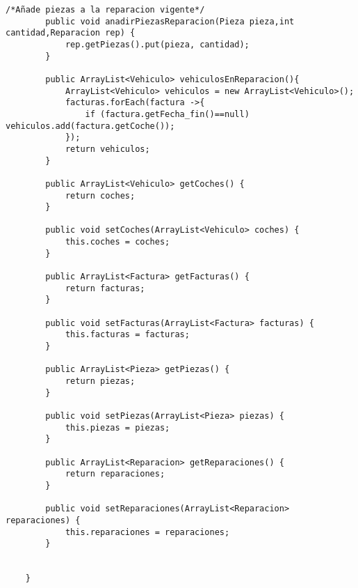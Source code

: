 \begin{lstlisting}[caption=GestorOperaciones.java (App Escritorio)]
        /*Añade piezas a la reparacion vigente*/
        public void anadirPiezasReparacion(Pieza pieza,int cantidad,Reparacion rep) {
            rep.getPiezas().put(pieza, cantidad);
        }
        
        public ArrayList<Vehiculo> vehiculosEnReparacion(){
            ArrayList<Vehiculo> vehiculos = new ArrayList<Vehiculo>();
            facturas.forEach(factura ->{
                if (factura.getFecha_fin()==null) vehiculos.add(factura.getCoche());
            });
            return vehiculos;
        }
    
        public ArrayList<Vehiculo> getCoches() {
            return coches;
        }
    
        public void setCoches(ArrayList<Vehiculo> coches) {
            this.coches = coches;
        }
    
        public ArrayList<Factura> getFacturas() {
            return facturas;
        }
    
        public void setFacturas(ArrayList<Factura> facturas) {
            this.facturas = facturas;
        }
    
        public ArrayList<Pieza> getPiezas() {
            return piezas;
        }
    
        public void setPiezas(ArrayList<Pieza> piezas) {
            this.piezas = piezas;
        }
    
        public ArrayList<Reparacion> getReparaciones() {
            return reparaciones;
        }
    
        public void setReparaciones(ArrayList<Reparacion> reparaciones) {
            this.reparaciones = reparaciones;
        }	
        
        
    }
    
    
\end{lstlisting}
\clearpage


